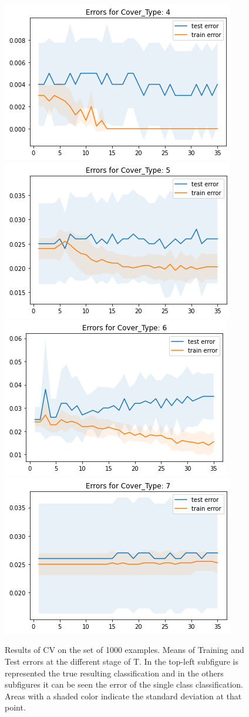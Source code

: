 \documentclass{scrartcl}
\begin{document}
\begin{figure}
{\includegraphics[width=.45\textwidth]{imgs/N1000_T35/cv_4_1000.png}} \quad
{\includegraphics[width=.45\textwidth]{imgs/N1000_T35/cv_5_1000.png}} \\
{\includegraphics[width=.45\textwidth]{imgs/N1000_T35/cv_6_1000.png}} \quad
{\includegraphics[width=.45\textwidth]{imgs/N1000_T35/cv_7_1000.png}}
\caption{Results of CV on the set of 1000 examples. Means of Training and Test errors at the different stage of T. In the top-left subfigure is represented the true resulting classification and in the others subfigures it can be seen the error of the single class classification. Areas with a shaded color indicate the standard deviation at that point.}
\label{figure:errors_1000}
\end{figure}
\end{document}
